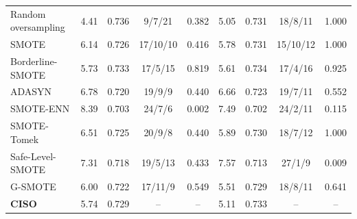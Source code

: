 \begin{table}[t]
\begin{tabular}{@{}lrrcc rrcc@{}}
Random oversampling & 4.41 & 0.736 & 9/7/21 & 0.382 & 5.05 & 0.731 & 18/8/11 & 1.000 \\
SMOTE & 6.14 & 0.726 & 17/10/10 & 0.416 & 5.78 & 0.731 & 15/10/12 & 1.000 \\
Borderline-SMOTE & 5.73 & 0.733 & 17/5/15 & 0.819 & 5.61 & 0.734 & 17/4/16 & 0.925 \\
ADASYN & 6.78 & 0.720 & 19/9/9 & 0.440 & 6.66 & 0.723 & 19/7/11 & 0.552 \\
SMOTE-ENN & 8.39 & 0.703 & 24/7/6 & 0.002 & 7.49 & 0.702 & 24/2/11 & 0.115 \\
SMOTE-Tomek & 6.51 & 0.725 & 20/9/8 & 0.440 & 5.89 & 0.730 & 18/7/12 & 1.000 \\
Safe-Level-SMOTE & 7.31 & 0.718 & 19/5/13 & 0.433 & 7.57 & 0.713 & 27/1/9 & 0.009 \\
G-SMOTE & 6.00 & 0.722 & 17/11/9 & 0.549 & 5.51 & 0.729 & 18/8/11 & 0.641 \\
\textbf{CISO} & 5.74 & 0.729 & -- & -- & 5.11 & 0.733 & -- & -- \\
\bottomrule\end{tabular}\end{table}
